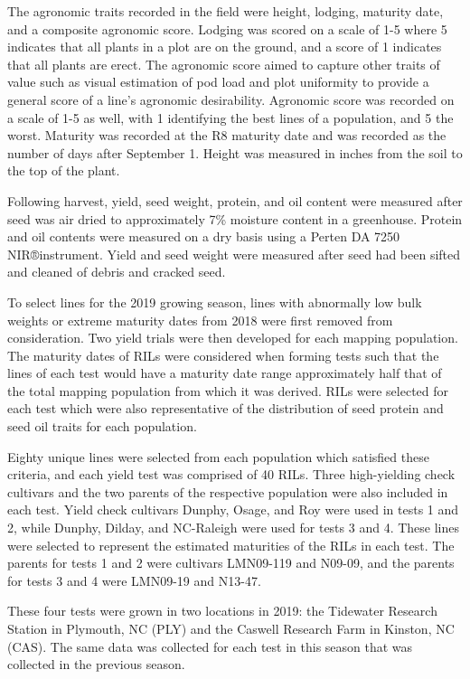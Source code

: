 \documentclass[Agronomy,article,submit,moreauthors,pdftex]{mdpi}
\begin{document}
The agronomic traits recorded in the field were height, lodging,
maturity date, and a composite agronomic score. Lodging was scored on a
scale of 1-5 where 5 indicates that all plants in a plot are on the
ground, and a score of 1 indicates that all plants are
erect\citep{fehr1987soybeans}. The agronomic score aimed to capture
other traits of value such as visual estimation of pod load and plot
uniformity to provide a general score of a line's agronomic
desirability. Agronomic score was recorded on a scale of 1-5 as well,
with 1 identifying the best lines of a population, and 5 the worst.
Maturity was recorded at the R8 maturity date and was recorded as the
number of days after September 1. Height was measured in inches from the
soil to the top of the plant.

Following harvest, yield, seed weight, protein, and oil content were
measured after seed was air dried to approximately 7\% moisture content
in a greenhouse. Protein and oil contents were measured on a dry basis
using a Perten DA 7250 NIR®instrument. Yield and seed weight were
measured after seed had been sifted and cleaned of debris and cracked
seed.

To select lines for the 2019 growing season, lines with abnormally low
bulk weights or extreme maturity dates from 2018 were first removed from
consideration. Two yield trials were then developed for each mapping
population. The maturity dates of RILs were considered when forming
tests such that the lines of each test would have a maturity date range
approximately half that of the total mapping population from which it
was derived. RILs were selected for each test which were also
representative of the distribution of seed protein and seed oil traits
for each population.

Eighty unique lines were selected from each population which satisfied
these criteria, and each yield test was comprised of 40 RILs. Three
high-yielding check cultivars and the two parents of the respective
population were also included in each test. Yield check cultivars
Dunphy, Osage\citep{Osage}, and Roy were used in tests 1 and 2, while
Dunphy, Dilday, and NC-Raleigh\citep{NCRaleighregistration} were used
for tests 3 and 4. These lines were selected to represent the estimated
maturities of the RILs in each test. The parents for tests 1 and 2 were
cultivars LMN09-119 and N09-09, and the parents for tests 3 and 4 were
LMN09-19 and N13-47.

These four tests were grown in two locations in 2019: the Tidewater
Research Station in Plymouth, NC (PLY) and the Caswell Research Farm in
Kinston, NC (CAS). The same data was collected for each test in this
season that was collected in the previous season.
\end{document}
